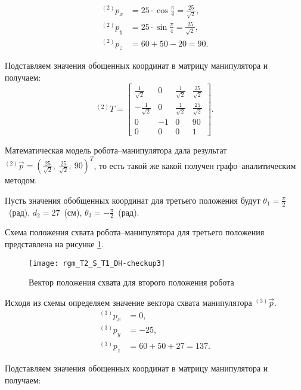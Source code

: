 \documentclass[oneside, final, 14pt]{extarticle}
\begin{document}
\begin{displaymath}
\begin{aligned}
  {}^{(2)}p_x&=25 \cdot \cos{\frac{\pi}{4}}= \frac{25}{\sqrt{2}},\\
  {}^{(2)}p_y&=25 \cdot \sin{\frac{\pi}{4}}= \frac{25}{\sqrt{2}},\\
  {}^{(2)}p_z&=60+50-20=90.
\end{aligned}
\end{displaymath}
\par
Подставляем значения обощенных координат в матрицу манипулятора и получаем:
\begin{displaymath}
{}^{(2)}T=
\begin{bmatrix}
  \frac{1}{\sqrt{2}} & 0 & \frac{1}{\sqrt{2}} & \frac{25}{\sqrt{2}} \\
  -\frac{1}{\sqrt{2}} & 0 & \frac{1}{\sqrt{2}} & \frac{25}{\sqrt{2}} \\
  0 & -1 & 0 & 90 \\
  0 & 0 & 0 & 1
\end{bmatrix}
.
\end{displaymath}
\par
Математическая модель робота--манипулятора дала результат \({}^{(2)} \vec p=(\frac{25}{\sqrt{2}},\:\frac{25}{\sqrt{2}},\:90)^T\), то есть такой же какой получен графо--аналитическим методом.
\par
Пусть значения обобщенных координат для третьего положения будут \(\theta_1 = \frac{\pi}{2}\)~(рад), \(d_2 = 27\)~(см), \(\theta_3 = -\frac{\pi}{2}\)~(рад).
\par
Схема положения схвата робота--манипулятора для третьего положения представлена на рисунке \ref{i:rgm_T2_S_T1_DH-checkup3}.
\begin{figure}[h]
  \centering
  \texttt{[image: rgm\_T2\_S\_T1\_DH-checkup3]}
  \caption{Вектор положения схвата для второго положения робота}
  \label{i:rgm_T2_S_T1_DH-checkup3}
\end{figure}
\par
Исходя из схемы определяем значение вектора схвата манипулятора \({}^{(3)} \vec p\).
\begin{displaymath}
\begin{aligned}
  {}^{(3)}p_x&=0,\\
  {}^{(3)}p_y&=-25,\\
  {}^{(3)}p_z&=60+50+27=137.
\end{aligned}
\end{displaymath}
\par
Подставляем значения обощенных координат в матрицу манипулятора и получаем:
\end{document}
